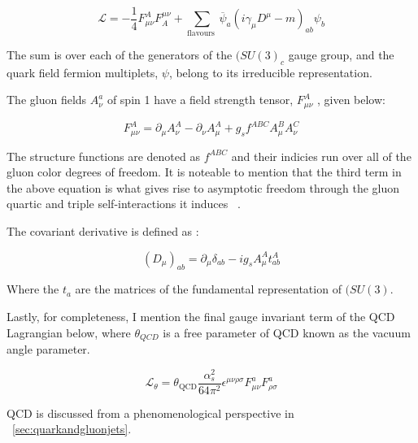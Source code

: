 \begin{equation}
\mathcal{L}=-\frac{1}{4} F_{\mu \nu}^{A} F_{A}^{\mu \nu}+\sum_{\text {flavours }} \overline{\psi}_{a}\left(i \gamma_{\mu} D^{\mu}-m\right)_{a b} \psi_{b}
\end{equation}


The sum is over each of the generators of the $(SU(3)_c$ gauge group, and the quark field fermion multiplets, $\psi$, belong to its irreducible representation.~\cite{Crewther:1995wq}

The gluon fields $A_{\nu}^a$ of spin 1 have a field strength tensor, $F_{\mu \nu}^{A}$ , given below:\newline 

\begin{equation}
F_{\mu \nu}^{A}=\partial_{\mu} A_{\nu}^{A}-\partial_{\nu} A_{\mu}^{A}+g_{s} f^{A B C} A_{\mu}^{B} A_{\nu}^{C}
\end{equation}


The structure functions are denoted as $f^{A B C}$ and their indicies run over all of the gluon color degrees of freedom. It is noteable to mention that the third term in the above equation is what gives rise to asymptotic freedom through the gluon quartic and triple self-interactions it induces ~\cite{Crewther:1995wq}.

The covariant derivative is defined as :\newline

\begin{equation}
\left(D_{\mu}\right)_{a b}=\partial_{\mu} \delta_{a b}-i g_{s} A_{\mu}^{A} t_{a b}^{A}
\end{equation}

Where the $t_{a}$ are the matrices of the fundamental representation of $(SU(3)$.

Lastly, for completeness, I mention the final gauge invariant term of the QCD Lagrangian below, where $\theta_{QCD}$ is a free parameter of QCD known as the vacuum angle parameter.

\begin{equation}
\mathcal{L}_{\theta}=\theta_{\mathrm{QCD}} \frac{\alpha_{s}^{2}}{64 \pi^{2}} \epsilon^{\mu \nu \rho \sigma} F_{\mu \nu}^{a} F_{\rho \sigma}^{a}
\end{equation}


QCD is discussed from a phenomenological perspective in ~\ref{sec:quarkandgluonjets}. 













